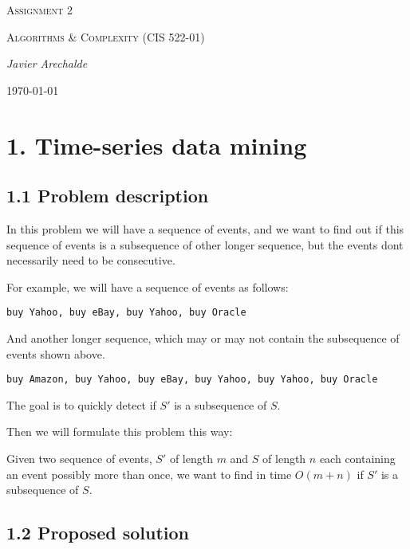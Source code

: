 \documentclass{article}
\begin{document}
\begin{titlepage}
	\centering
	{\scshape\LARGE Assignment 2\par}
	\vspace{1cm}
	{\scshape\Large Algorithms \& Complexity (CIS 522-01)\par}
	\vspace{1.5cm}
	{\Large\itshape Javier Arechalde\par}
	\vfill
	{\large \today\par}
\end{titlepage}

\section*{1. Time-series data mining}

\subsection*{1.1 Problem description}

In this problem we will have a sequence of events, and we want to find out if this sequence of events is a subsequence of other longer sequence, but the events dont necessarily need to be consecutive.

For example, we will have a sequence of events as follows:

\begin{center}
\texttt{buy Yahoo, buy eBay, buy Yahoo, buy Oracle}
\end{center}

And another longer sequence, which may or may not contain the subsequence of events shown above.

\begin{center}
\texttt{buy Amazon, buy Yahoo, buy eBay, buy Yahoo, buy Yahoo, buy Oracle}
\end{center}

The goal is to quickly detect if $S'$ is a subsequence of $S$.

Then we will formulate this problem this way:

Given two sequence of events, $S'$ of length $m$ and $S$ of length $n$ each containing an event possibly more than once, we want to find in time $O(m+n)$ if $S'$ is a subsequence of $S$.

\subsection*{1.2 Proposed solution}
\end{document}
